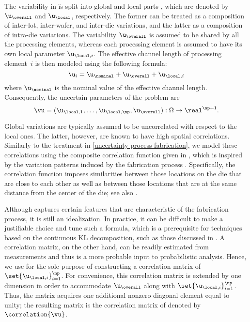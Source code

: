The variability in \u is split into global and local parts \cite{shen2009,
chandra2010, juan2012}, which are denoted by $\u_\overall$ and $\u_\local$,
respectively. The former can be treated as a composition of inter-lot,
inter-wafer, and inter-die variations, and the latter as a composition of
intra-die variations. The variability $\u_\overall$ is assumed to be shared by
all the \np processing elements, whereas each processing element is assumed to
have its own local parameter $\u_{\local, i}$. The effective channel length of
processing element~$i$ is then modeled using the following formula:
\[
  \u_i = \u_\nominal + \u_\overall + \u_{\local, i}
\]
where $\u_\nominal$ is the nominal value of the effective channel length.
Consequently, the uncertain parameters of the problem are
\[
  \vu = (\u_{\local, 1}, \dotsc, \u_{\local, \np}, \u_\overall): \Omega \to \real^{\np + 1}.
\]

Global variations are typically assumed to be uncorrelated with respect to the
local ones. The latter, however, are known to have high spatial correlations.
Similarly to the treatment in \cref{uncertainty-process-fabrication}, we model
these correlations using the composite correlation function given in
, which is inspired by the variation patterns induced by
the fabrication process \cite{friedberg2005, chandrakasan2000, cheng2011}.
Specifically, the correlation function imposes similarities between those
locations on the die that are close to each other as well as between those
locations that are at the same distance from the center of the die; see also
\cite{ghanem1991, ghanta2006, bhardwaj2008, huang2009a, lee2013}.

Although  captures certain features that are
characteristic of the fabrication process, it is still an idealization. In
practice, it can be difficult to make a justifiable choice and tune such a
formula, which is a prerequisite for techniques based on the continuous \ac{KL}
decomposition, such as those discussed in . A correlation
matrix, on the other hand, can be readily estimated from measurements and thus
is a more probable input to probabilistic analysis. Hence, we use
 for the sole purpose of constructing a correlation
matrix of $\set{\u_{\local, i}}_{i = 1}^\np$. For convenience, this correlation
matrix is extended by one dimension in order to accommodate $\u_\overall$ along
with $\set{\u_{\local, i}}_{i = 1}^\np$. Thus, the matrix acquires one
additional nonzero diagonal element equal to unity; the resulting matrix is the
correlation matrix of \vu denoted by $\correlation{\vu}$.

